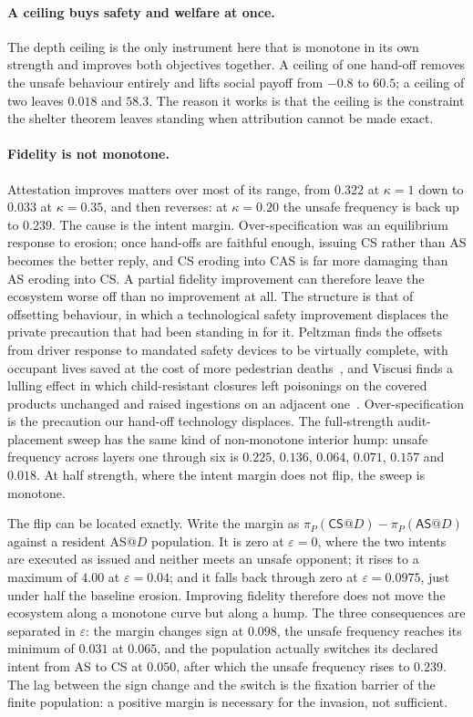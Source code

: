 \documentclass[11pt,a4paper]{article}
\theoremstyle{definition}
\newcommand{\AS}{\textsf{AS}}
\newcommand{\CS}{\textsf{CS}}
\newcommand{\CAS}{\textsf{CAS}}
\begin{document}
\paragraph{A ceiling buys safety and welfare at once.}
The depth ceiling is the only instrument here that is monotone in its own
strength and improves both objectives together. A ceiling of one hand-off
removes the unsafe behaviour entirely and lifts social payoff from $-0.8$ to
$60.5$; a ceiling of two leaves $0.018$ and $58.3$. The reason it works is that
the ceiling is the constraint the shelter theorem leaves standing when
attribution cannot be made exact.

\paragraph{Fidelity is not monotone.}
Attestation improves matters over most of its range, from $0.322$ at
$\kappa=1$ down to $0.033$ at $\kappa=0.35$, and then reverses: at $\kappa=0.20$ the
unsafe frequency is back up to $0.239$. The cause is the intent margin.
Over-specification was an equilibrium response to erosion; once hand-offs are
faithful enough, issuing \CS{} rather than \AS{} becomes the better reply, and
\CS{} eroding into \CAS{} is far more damaging than \AS{} eroding into \CS{}.
A partial fidelity improvement can therefore leave the ecosystem worse off than
no improvement at all. The structure is that of offsetting behaviour, in which
a technological safety improvement displaces the private precaution that had
been standing in for it. Peltzman finds the offsets from driver response to
mandated safety devices to be virtually complete, with occupant lives saved at
the cost of more pedestrian deaths~\citep{peltzman1975automobile}, and Viscusi
finds a lulling effect in which child-resistant closures left poisonings on the
covered products unchanged and raised ingestions on an adjacent
one~\citep{viscusi1985consumer}. Over-specification is
the precaution our hand-off technology displaces.
The full-strength audit-placement sweep has the same kind of non-monotone
interior hump: unsafe frequency across layers one through six is $0.225$,
$0.136$, $0.064$, $0.071$, $0.157$ and $0.018$. At half strength, where the
intent margin does not flip, the sweep is monotone.

The flip can be located exactly. Write the margin as
$\pi_{P}(\CS{}@D)-\pi_{P}(\AS{}@D)$ against a resident \AS{}$@D$ population.
It is zero at $\varepsilon=0$, where the two intents are executed as issued and
neither meets an unsafe opponent; it rises to a maximum of $4.00$ at
$\varepsilon=0.04$; and it falls back through zero at $\varepsilon=0.0975$,
just under half the baseline erosion. Improving fidelity therefore does not
move the ecosystem along a monotone curve but along a hump. The three
consequences are separated in $\varepsilon$: the margin changes sign at
$0.098$, the unsafe frequency reaches its minimum of $0.031$ at $0.065$, and
the population actually switches its declared intent from \AS{} to \CS{} at
$0.050$, after which the unsafe frequency rises to $0.239$. The lag between the
sign change and the switch is the fixation barrier of the finite population: a
positive margin is necessary for the invasion, not sufficient.
\end{document}
